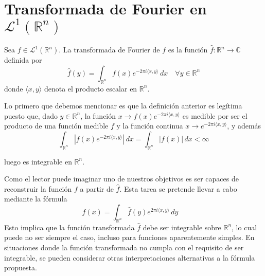 
\chapter{Transformada de Fourier en $\mathscr{L}^1(\mathbb{R}^n)$}
\begin{definicion}\label{def1}
Sea $f \in \mathscr{L}^1(\mathbb{R}^n)$. La transformada de Fourier de $f$ es  la función $\widehat{f} : \mathbb{R}^n \rightarrow \mathbb{C}$ definida por 
\begin{equation}
    \widehat{f}(y) = \int_{\mathbb{R}^n} f(x) e^{-2\pi i \langle x, y \rangle} \, dx \quad \forall y \in \mathbb{R}^n
\end{equation}
donde $\langle x, y \rangle$ denota el producto escalar en $\mathbb{R}^n$.
\end{definicion}


\begin{observacion}
    Lo primero que debemos mencionar es que la definición anterior es legítima puesto que, dado $y \in \mathbb{R}^n$, la función $x \rightarrow f(x)e^{-2\pi i\langle x, y \rangle}$ es medible por ser el producto de una función medible $f$ y la función continua $x \rightarrow e^{-2 \pi i \langle x, y \rangle}$, y además 
    \begin{equation}
        \int_{\mathbb{R}^n}|f(x)e^{-2\pi i\langle x, y \rangle}| \, dx  = \int_{\mathbb{R}^n}|f(x)| \, dx < \infty
    \end{equation}
\end{observacion}
\noindent luego es integrable en $\mathbb{R}^n$.

\begin{observacion}
Como el lector puede imaginar uno de nuestros objetivos es ser capaces de reconstruir la función $f$ a partir de $\widehat{f}$. Esta tarea se pretende llevar a cabo mediante la fórmula 
\begin{equation}
    f(x) = \int_{\mathbb{R}^n} \widehat{f}(y) e^{2\pi i \langle x, y \rangle} \, dy \quad 
\end{equation}
Esto implica que la función transformada \( \widehat{f} \) debe ser integrable sobre \( \mathbb{R}^n \), lo cual puede no ser siempre el caso, incluso para funciones aparentemente simples. En situaciones donde la función transformada no cumpla con el requisito de ser integrable, se pueden considerar otras interpretaciones alternativas a la fórmula propuesta.
\end{observacion}

